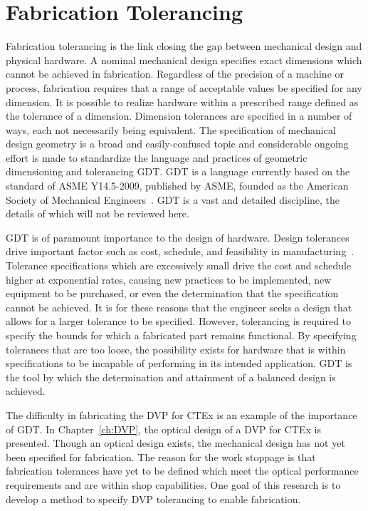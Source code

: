 \section{Fabrication Tolerancing}
\label{sec:fabTol}

Fabrication tolerancing is the link closing the gap between mechanical design and physical hardware. A nominal mechanical design specifies exact dimensions which cannot be achieved in fabrication. Regardless of the precision of a machine or process, fabrication requires that a range of acceptable values be specified for any dimension. It is possible to realize hardware within a prescribed range defined as the tolerance of a dimension. Dimension tolerances are specified in a number of ways, each not necessarily being equivalent. The specification of mechanical design geometry is a broad and easily-confused topic and considerable ongoing effort is made to standardize the language and practices of geometric dimensioning and tolerancing \ac{GDT}. \ac{GDT} is a language currently based on the standard of ASME Y14.5-2009, published by ASME, founded as the American Society of Mechanical Engineers~\cite{GDT}. \ac{GDT} is a vast and detailed discipline, the details of which will not be reviewed here. 

\ac{GDT} is of paramount importance to the design of hardware. Design tolerances drive important factor such as cost, schedule, and feasibility in manufacturing~\cite{Shigley}. Tolerance specifications which are excessively small drive the cost and schedule higher at exponential rates, causing new practices to be implemented, new equipment to be purchased, or even the determination that the specification cannot be achieved. It is for these reasons that the engineer seeks a design that allows for a larger tolerance to be specified. However, tolerancing is required to specify the bounds for which a fabricated part remains functional. By specifying tolerances that are too loose, the possibility exists for hardware that is within specifications to be incapable of performing in its intended application. \ac{GDT} is the tool by which the determination and attainment of a balanced design is achieved.

The difficulty in fabricating the \ac{DVP} for \ac{CTEx} is an example of the importance of \ac{GDT}. In Chapter~\ref{ch:DVP}, the optical design of a \ac{DVP} for \ac{CTEx} is presented. Though an optical design exists, the mechanical design has not yet been specified for fabrication. The reason for the work stoppage is that fabrication tolerances have yet to be defined which meet the optical performance requirements and are within shop capabilities. One goal of this research is to develop a method to specify \ac{DVP} tolerancing to enable fabrication.

